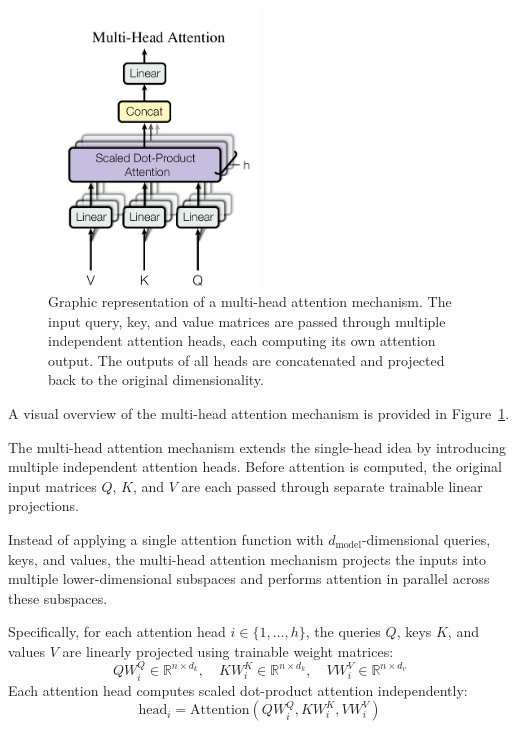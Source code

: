 \documentclass{pracalicmgr}
\begin{document}
\begin{figure}[h]
    \centering
    \includegraphics[width=0.5\textwidth]{src/multiHead.png}
    \caption{Graphic representation of a multi-head attention mechanism. The input query, key, and value matrices are passed through multiple independent attention heads, each computing its own attention output. The outputs of all heads are concatenated and projected back to the original dimensionality.}
    \label{fig:multiHeadAttention}
\end{figure}

A visual overview of the multi-head attention mechanism is provided in Figure~\ref{fig:multiHeadAttention}.

The multi-head attention mechanism extends the single-head idea by introducing multiple independent attention heads. Before attention is computed, the original input matrices \( Q \), \( K \), and \( V \) are each passed through separate trainable linear projections.

Instead of applying a single attention function with \( d_{\text{model}} \)-dimensional queries, keys, and values, the multi-head attention mechanism projects the inputs into multiple lower-dimensional subspaces and performs attention in parallel across these subspaces.

Specifically, for each attention head \( i \in \{1, \dots, h\} \), the queries \( Q \), keys \( K \), and values \( V \) are linearly projected using trainable weight matrices:
\[
QW_i^Q \in \mathbb{R}^{n \times d_k}, \quad KW_i^K \in \mathbb{R}^{n \times d_k}, \quad VW_i^V \in \mathbb{R}^{n \times d_v}
\]
Each attention head computes scaled dot-product attention independently:
\[
\text{head}_i = \text{Attention}(QW_i^Q, KW_i^K, VW_i^V)
\]
\end{document}
